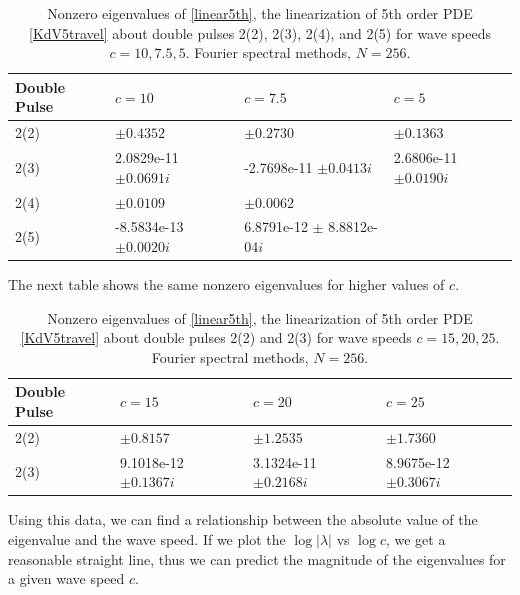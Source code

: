 \documentclass[12pt]{article}
\begin{document}
\begin{table}[H] 
\begin{tabular}{l|lll}
 Double Pulse   & $c = 10$            & $c=7.5$                         & $c=5$        \\ \hline
  2(2) &     $\pm 0.4352$             & $\pm 0.2730$                    & $\pm 0.1363$ \\ 
  2(3) &     2.0829e-11 $\pm 0.0691i$ & -2.7698e-11 $\pm 0.0413i$       & 2.6806e-11 $\pm 0.0190i$\\ 
  2(4) &     $\pm 0.0109$             & $\pm 0.0062$                    & \\ 
  2(5) &    -8.5834e-13 $\pm 0.0020i$ & 6.8791e-12 $\pm$ 8.8812e-04$i$  & \\
\end{tabular}
\caption{Nonzero eigenvalues of \eqref{linear5th}, the linearization of 5th order PDE \eqref{KdV5travel} about double pulses 2(2), 2(3), 2(4), and 2(5) for wave speeds $c = 10, 7.5, 5$. Fourier spectral methods, $N = 256$.}
\label{dpeigs}
\end{table}

The next table shows the same nonzero eigenvalues for higher values of $c$.

\begin{table}[H]
\begin{tabular}{l|lll}
 Double Pulse   & $c = 15$            & $c=20$                          & $c=25$        \\ \hline
  2(2) &     $\pm 0.8157$             & $\pm 1.2535$                    & $\pm 1.7360$ \\ 
  2(3) &     9.1018e-12 $\pm 0.1367i$ & 3.1324e-11 $\pm 0.2168i$        & 8.9675e-12 $\pm 0.3067i$\\ 
\end{tabular}
\caption{Nonzero eigenvalues of \eqref{linear5th}, the linearization of 5th order PDE \eqref{KdV5travel} about double pulses 2(2) and 2(3) for wave speeds $c = 15, 20, 25$. Fourier spectral methods, $N = 256$.}
\end{table}

Using this data, we can find a relationship between the absolute value of the eigenvalue and the wave speed. If we plot the $\log{|\lambda|}$ vs $\log{c}$, we get a reasonable straight line, thus we can predict the magnitude of the eigenvalues for a given wave speed $c$.
\end{document}
